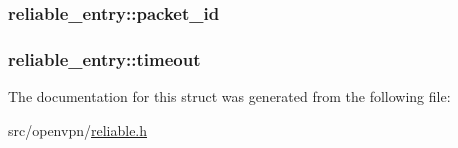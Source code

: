 \subsubsection[{packet\+\_\+id}]{ reliable\+\_\+entry\+::packet\+\_\+id}\label{structreliable__entry_a82e3388aade524471a76cd51a157d11e}
\hypertarget{structreliable__entry_aec99769617a325b22d51865a668b14b7}{}
\subsubsection[{timeout}]{ reliable\+\_\+entry\+::timeout}\label{structreliable__entry_aec99769617a325b22d51865a668b14b7}


The documentation for this struct was generated from the following file\+:\begin{DoxyCompactItemize}
\item 
src/openvpn/\hyperlink{reliable_8h}{reliable.\+h}\end{DoxyCompactItemize}
